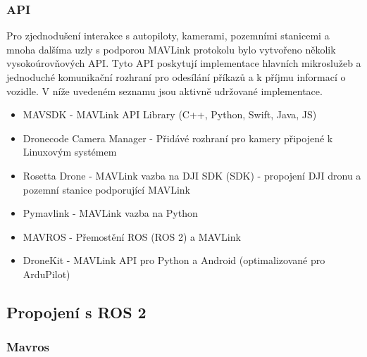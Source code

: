 \subsubsection{API}

Pro zjednodušení interakce s autopiloty, kamerami, pozemními stanicemi a mnoha dalšíma uzly s podporou MAVLink protokolu bylo vytvořeno několik vysokoúrovňových \acs{API}. Tyto \acs{API} poskytují implementace hlavních mikroslužeb a jednoduché komunikační rozhraní pro odesílání příkazů a k příjmu informací o vozidle. V níže uvedeném seznamu jsou aktivně udržované implementace.

\begin{itemize}
    \item MAVSDK - MAVLink API Library (C++, Python, Swift, Java, JS) 
    \item Dronecode Camera Manager - Přidávé rozhraní pro kamery připojené k Linuxovým systémem
    \item Rosetta Drone - MAVLink vazba na DJI \acs{SDK} (\acl{SDK}) - propojení DJI dronu a pozemní stanice podporující MAVLink
    \item Pymavlink - MAVLink vazba na Python
    \item MAVROS - Přemostění ROS (ROS 2) a MAVLink
    \item DroneKit - MAVLink API pro Python a Android (optimalizované pro ArduPilot)
\end{itemize}

\subsection{Propojení s ROS 2}



\subsubsection{Mavros}
